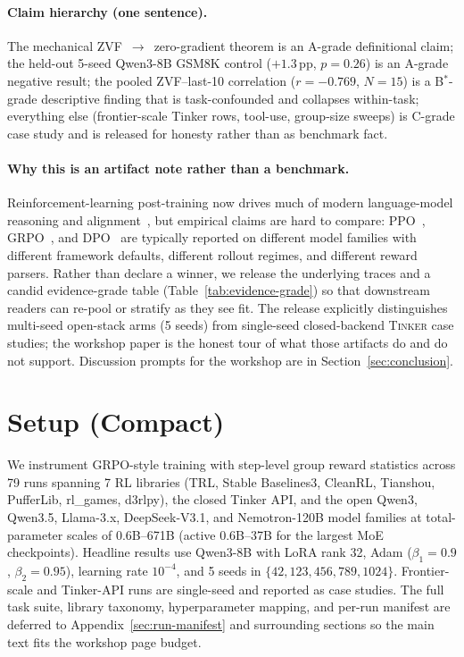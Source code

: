 \documentclass{article}
\newcommand{\tinker}{\textsc{Tinker}}
\begin{document}
\paragraph{Claim hierarchy (one sentence).}
The mechanical ZVF~$\to$~zero-gradient theorem is an A-grade definitional
claim; the held-out 5-seed Qwen3-8B GSM8K control ($+1.3\,$pp,
$p{=}0.26$) is an A-grade negative result; the pooled ZVF--last-10
correlation ($r{=}{-}0.769$, $N{=}15$) is a B$^{*}$-grade descriptive
finding that is task-confounded and collapses within-task; everything
else (frontier-scale Tinker rows, tool-use, group-size sweeps) is C-grade
case study and is released for honesty rather than as benchmark fact.

\paragraph{Why this is an artifact note rather than a benchmark.}
Reinforcement-learning post-training now drives much of modern language-model
reasoning and alignment~\citep{ouyang2022training,guo2025deepseekr1nature},
but empirical claims are hard to compare:
PPO~\citep{schulman2017proximal}, GRPO~\citep{shao2024deepseekmath}, and
DPO~\citep{rafailov2024direct} are typically reported on different model
families with different framework defaults, different rollout regimes, and
different reward parsers. Rather than declare a winner, we release the
underlying traces and a candid evidence-grade table
(Table~\ref{tab:evidence-grade}) so that downstream readers can re-pool
or stratify as they see fit. The release explicitly distinguishes
multi-seed open-stack arms (5 seeds) from single-seed closed-backend
\tinker{} case studies; the workshop paper is the honest tour of what those
artifacts do and do not support. Discussion prompts for the workshop are
in Section~\ref{sec:conclusion}.
 
\section{Setup (Compact)}
\label{sec:setup}


We instrument GRPO-style training with step-level group reward statistics
across 79 runs spanning 7 RL libraries (TRL, Stable Baselines3, CleanRL,
Tianshou, PufferLib, rl\_games, d3rlpy), the closed Tinker API, and the open
Qwen3, Qwen3.5, Llama-3.x, DeepSeek-V3.1, and Nemotron-120B model families at
total-parameter scales of 0.6B--671B (active 0.6B--37B for the largest MoE
checkpoints). Headline results use Qwen3-8B with LoRA rank 32, Adam
($\beta_1{=}0.9$, $\beta_2{=}0.95$), learning rate $10^{-4}$, and 5 seeds in
$\{42,123,456,789,1024\}$. Frontier-scale and Tinker-API runs are single-seed
and reported as case studies. The full task suite, library taxonomy,
hyperparameter mapping, and per-run manifest are deferred to
Appendix~\ref{sec:run-manifest} and surrounding sections so the main text fits
the workshop page budget.
\end{document}
